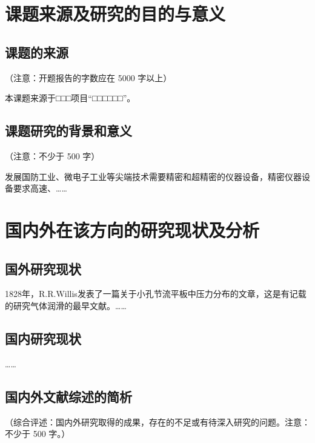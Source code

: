 
\section{课题来源及研究的目的与意义}

\subsection{课题的来源}

（注意：开题报告的字数应在 5000 字以上）

本课题来源于□□□项目“□□□□□□”。

\subsection{课题研究的背景和意义}

（注意：不少于 500 字）

发展国防工业、微电子工业等尖端技术需要精密和超精密的仪器设备，精密仪器设备要求高速、……

\section{国内外在该方向的研究现状及分析}

\subsection{国外研究现状}

1828年，R.R.Willis\cite{zhao1998}发表了一篇关于小孔节流平板中压力分布的文章，这是有记载的研究气体润滑的最早文献。……

\subsection{国内研究现状}

……\cite{lin1992,xin1999}

\subsection{国内外文献综述的简析}

（综合评述：国内外研究取得的成果，存在的不足或有待深入研究的问题。注意：不少于 500 字。）

